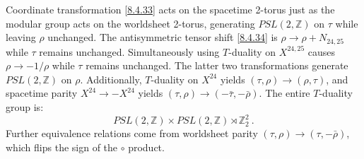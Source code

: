 Coordinate transformation \eqref{8.4.33} acts on the spacetime 2-torus just as the modular group acts on the worldsheet 2-torus, generating $P S L(2, \mathds{Z})$ on $\tau$ while leaving $\rho$ unchanged. 
The antisymmetric tensor shift \eqref{8.4.34} is $\rho \rightarrow \rho+N_{24,25}$ while $\tau$ remains unchanged. 
Simultaneously using $T$-duality on $X^{24,25}$ causes $\rho \rightarrow-1 / \rho$ while $\tau$ remains unchanged. 
The latter two transformations generate $P S L(2, \mathds{Z})$ on $\rho$. Additionally, $T$-duality on $X^{24}$ yields $(\tau, \rho) \rightarrow(\rho, \tau)$, 
and spacetime parity $X^{24} \rightarrow-X^{24}$ yields $(\tau, \rho) \rightarrow(-\bar{\tau},-\bar{\rho})$. 
The entire $T$-duality group is:
\begin{equation}
	P S L(2, \mathds{Z}) \times P S L(2, \mathds{Z}) \rtimes \mathds{Z}_{2}^{2} \:. \label{8.4.39}
\end{equation}
Further equivalence relations come from worldsheet parity $(\tau, \rho) \rightarrow(\tau,-\bar{\rho}) $, which flips the sign of the $\vysmwhtcircle$ product. 

